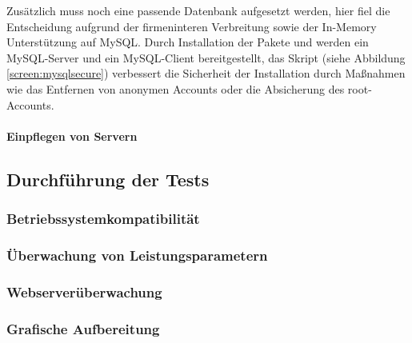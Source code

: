 Zusätzlich muss noch eine passende Datenbank aufgesetzt werden, hier fiel die Entscheidung aufgrund der firmeninteren Verbreitung sowie der In-Memory Unterstützung auf MySQL. Durch Installation der Pakete  und  werden ein MySQL-Server und ein MySQL-Client bereitgestellt, das Skript  (siehe Abbildung \ref{screen:mysqlsecure}) verbessert die Sicherheit der Installation durch Maßnahmen wie das Entfernen von anonymen Accounts oder die Absicherung des root-Accounts.

\paragraph{Einpflegen von Servern}
\label{sec:EinpflegenServer}

\subsection{Durchführung der Tests}
\label{sec:DurchführungTests}



\subsubsection{Betriebssystemkompatibilität}
\label{sec:EinpflegenServer}

\subsubsection{Überwachung von Leistungsparametern}
\label{sec:ÜberwachungLeistungsparameter}

\subsubsection{Webserverüberwachung}
\label{sec:ÜberwachungWebserver}

\subsubsection{Grafische Aufbereitung}
\label{sec:GrafischeAufbereitung}